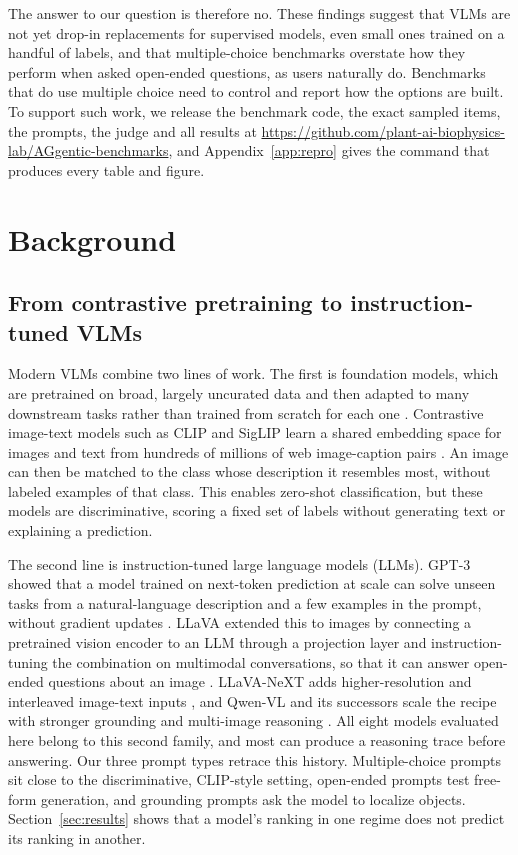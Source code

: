 \documentclass[10pt,letterpaper]{article}
\newcommand{\repo}{\url{https://github.com/plant-ai-biophysics-lab/AGgentic-benchmarks}}
\begin{document}
The answer to our question is therefore no. These findings suggest that VLMs are not yet drop-in replacements for supervised models, even small ones trained on a handful of labels, and that multiple-choice benchmarks overstate how they perform when asked open-ended questions, as users naturally do. Benchmarks that do use multiple choice need to control and report how the options are built. To support such work, we release the benchmark code, the exact sampled items, the prompts, the judge and all results at \repo, and Appendix~\ref{app:repro} gives the command that produces every table and figure.

\section{Background}
\label{sec:background}

\subsection{From contrastive pretraining to instruction-tuned VLMs}
\label{sec:background_history}
Modern VLMs combine two lines of work. The first is foundation models, which are pretrained on broad, largely uncurated data and then adapted to many downstream tasks rather than trained from scratch for each one \cite{bommasani_opportunities_2021}. Contrastive image-text models such as CLIP and SigLIP learn a shared embedding space for images and text from hundreds of millions of web image-caption pairs \cite{radford_learning_2021, zhai_sigmoid_2023}. An image can then be matched to the class whose description it resembles most, without labeled examples of that class. This enables zero-shot classification, but these models are discriminative, scoring a fixed set of labels without generating text or explaining a prediction.

The second line is instruction-tuned large language models (LLMs). GPT-3 showed that a model trained on next-token prediction at scale can solve unseen tasks from a natural-language description and a few examples in the prompt, without gradient updates \cite{brown_language_2020}. LLaVA extended this to images by connecting a pretrained vision encoder to an LLM through a projection layer and instruction-tuning the combination on multimodal conversations, so that it can answer open-ended questions about an image \cite{liu_visual_2023}. LLaVA-NeXT adds higher-resolution and interleaved image-text inputs \cite{li_llava-next-interleave_2024}, and Qwen-VL and its successors scale the recipe with stronger grounding and multi-image reasoning \cite{bai_qwen-vl_2023, bai_qwen3-vl_2025}. All eight models evaluated here belong to this second family, and most can produce a reasoning trace before answering. Our three prompt types retrace this history. Multiple-choice prompts sit close to the discriminative, CLIP-style setting, open-ended prompts test free-form generation, and grounding prompts ask the model to localize objects. Section~\ref{sec:results} shows that a model's ranking in one regime does not predict its ranking in another.
\end{document}
